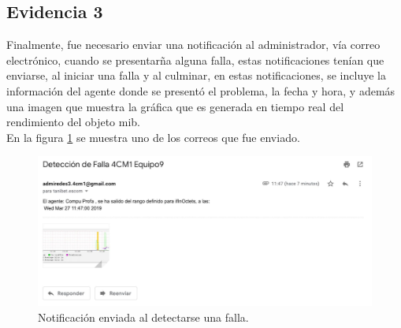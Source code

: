 \subsection{Evidencia 3}
Finalmente, fue necesario enviar una notificación al administrador, vía correo electrónico, cuando se presentarña alguna falla, estas notificaciones tenían que enviarse, al iniciar una falla y al culminar, en estas notificaciones, se incluye la información del agente donde se presentó el problema, la fecha y hora, y además una imagen que muestra la gráfica que es generada en tiempo real del rendimiento del objeto mib.\\En la figura \ref{img:1-5} se muestra uno de los correos que fue enviado.
\begin{figure}[H]
  \centering
    \includegraphics[scale=.75]{imagenes/segundo/5.png}
    \caption{Notificación enviada al detectarse una falla.}
    \label{img:1-5}
\end{figure}
